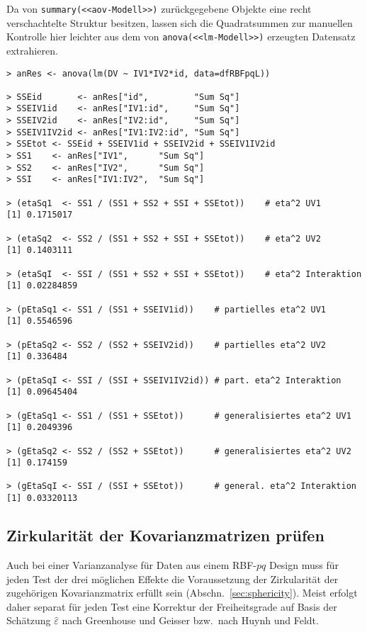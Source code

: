 Da von \lstinline!summary(<<aov-Modell>>)! zurückgegebene Objekte eine recht verschachtelte Struktur besitzen, lassen sich die Quadratsummen zur manuellen Kontrolle hier leichter aus dem von \lstinline!anova(<<lm-Modell>>)! erzeugten Datensatz extrahieren.
\begin{lstlisting}
> anRes <- anova(lm(DV ~ IV1*IV2*id, data=dfRBFpqL))

> SSEid       <- anRes["id",         "Sum Sq"]
> SSEIV1id    <- anRes["IV1:id",     "Sum Sq"]
> SSEIV2id    <- anRes["IV2:id",     "Sum Sq"]
> SSEIV1IV2id <- anRes["IV1:IV2:id", "Sum Sq"]
> SSEtot <- SSEid + SSEIV1id + SSEIV2id + SSEIV1IV2id
> SS1    <- anRes["IV1",      "Sum Sq"]
> SS2    <- anRes["IV2",      "Sum Sq"]
> SSI    <- anRes["IV1:IV2",  "Sum Sq"]

> (etaSq1  <- SS1 / (SS1 + SS2 + SSI + SSEtot))    # eta^2 UV1
[1] 0.1715017

> (etaSq2  <- SS2 / (SS1 + SS2 + SSI + SSEtot))    # eta^2 UV2
[1] 0.1403111

> (etaSqI  <- SSI / (SS1 + SS2 + SSI + SSEtot))    # eta^2 Interaktion
[1] 0.02284859

> (pEtaSq1 <- SS1 / (SS1 + SSEIV1id))    # partielles eta^2 UV1
[1] 0.5546596

> (pEtaSq2 <- SS2 / (SS2 + SSEIV2id))    # partielles eta^2 UV2
[1] 0.336484

> (pEtaSqI <- SSI / (SSI + SSEIV1IV2id)) # part. eta^2 Interaktion
[1] 0.09645404

> (gEtaSq1 <- SS1 / (SS1 + SSEtot))      # generalisiertes eta^2 UV1
[1] 0.2049396

> (gEtaSq2 <- SS2 / (SS2 + SSEtot))      # generalisiertes eta^2 UV2
[1] 0.174159

> (gEtaSqI <- SSI / (SSI + SSEtot))      # general. eta^2 Interaktion
[1] 0.03320113
\end{lstlisting}

\subsection{Zirkularität der Kovarianzmatrizen prüfen}

Auch bei einer Varianzanalyse für Daten aus einem RBF-$pq$ Design muss für jeden Test der drei möglichen Effekte die Voraussetzung der Zirkularität der zugehörigen Kovarianzmatrix erfüllt sein (Abschn.\ \ref{sec:sphericity}). Meist erfolgt daher separat für jeden Test eine Korrektur der Freiheitsgrade auf Basis der Schätzung $\hat{\varepsilon}$ nach Greenhouse und Geisser bzw.\ nach Huynh und Feldt.

